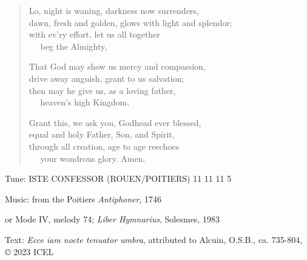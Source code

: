 \hymn

\begin{verse}
Lo, night is waning, darkness now surrenders,\\
dawn, fresh and golden, glows with light and splendor;\\
with ev’ry effort, let us all together\\
   beg the Almighty,

That God may show us mercy and compassion,\\
drive away anguish, grant to us salvation;\\
then may he give us, as a loving father,\\
   heaven’s high Kingdom.

Grant this, we ask you, Godhead ever blessed,\\
equal and holy Father, Son, and Spirit,\\
through all creation, age to age reechoes\\
   your wondrous glory. Amen.
\end{verse}

\begin{hymnsource}
Tune: ISTE CONFESSOR (ROUEN/POITIERS) 11 11 11 5

Music: from the Poitiers \emph{Antiphoner}, 1746

or Mode IV, melody 74; \emph{Liber Hymnarius}, Solesmes, 1983

Text: \emph{Ecce iam nocte tenuator umbra}, attributed to Alcuin, O.S.B., ca. 735-804, © 2023 ICEL
\end{hymnsource}